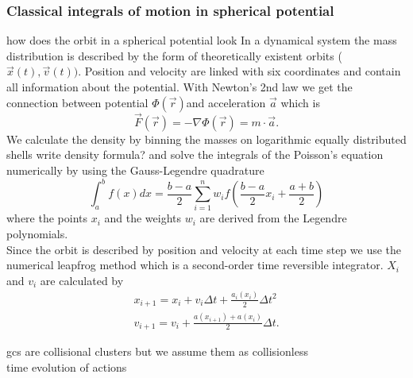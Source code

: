 \subsubsection{Classical integrals of motion in spherical potential}
\color{red} how does the orbit in a spherical potential look \color{black}
In a dynamical system the mass distribution is described by the form of theoretically existent orbits (\(\vec{x}(t),\vec{v}(t))\). Position and velocity are linked with six coordinates and contain all information about the potential. With Newton's 2nd law we get the connection between potential \(\Phi(\vec{r})\)and acceleration \(\vec{a}\) which is \[\vec{F}(\vec{r})=-\nabla\Phi(\vec{r})=m\cdot\vec{a}.\]  We calculate the density by binning the masses on logarithmic equally distributed shells \color{red} write density formula? \color{black} and solve the integrals of the Poisson's equation numerically by using the Gauss-Legendre quadrature \[\int_a^b f(x)dx = \frac{b-a}{2}\sum_{i=1}^n w_i f\left(\frac{b-a}{2}x_i+\frac{a+b}{2}\right)\] where the points \(x_i\) and the weights \(w_i\) are derived from the Legendre polynomials.\\ Since the orbit is described by position and velocity at each time step we use the numerical leapfrog method which is a second-order time reversible integrator. \(X_i\) and \(v_i\) are calculated by 
\begin{align*}
x_{i+1}=x_i+v_i\Delta t+\frac{a_i(x_i)}{2}\Delta t^2 \\
v_{i+1}=v_i+\frac{a(x_{i+1})+a(x_i)}{2}\Delta t.
\end{align*}

\color{red} gcs are collisional clusters but we assume them as collisionless \\ time evolution of actions \color{black}

